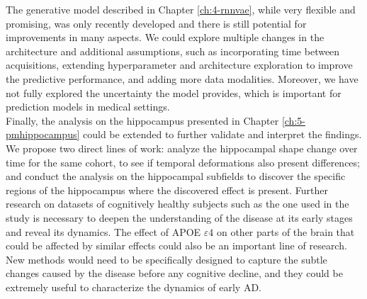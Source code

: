 The generative model described in Chapter \ref{ch:4-rnnvae}, while very flexible and promising, was only recently developed and there is still potential for improvements in many aspects. We could explore multiple changes in the architecture and additional assumptions, such as incorporating time between acquisitions, extending hyperparameter and architecture exploration to improve the predictive performance, and adding more data modalities. Moreover, we have not fully explored the uncertainty the model provides, which is important for prediction models in medical settings. \\

Finally, the analysis on the hippocampus presented in Chapter \ref{ch:5-pmhippocampus} could be extended to further validate and interpret the findings. We propose two direct lines of work: analyze the hippocampal shape change over time for the same cohort, to see if temporal deformations also present differences; and conduct the analysis on the hippocampal subfields to discover the specific regions of the hippocampus where the discovered effect is present. Further research on datasets of cognitively healthy subjects such as the one used in the study is necessary to deepen the understanding of the disease at its early stages and reveal its dynamics. The effect of APOE $\varepsilon4$ on other parts of the brain that could be affected by similar effects could also be an important line of research. New methods would need to be specifically designed to capture the subtle changes caused by the disease before any cognitive decline, and they could be extremely useful to characterize the dynamics of early AD.